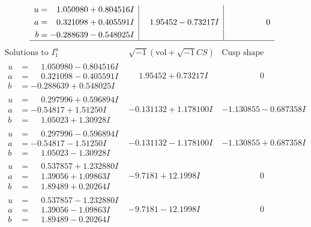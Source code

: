 \documentclass[1p]{elsarticle_modified}
\theoremstyle{definition}
\newcommand{\I}{\sqrt{-1}}
\begin{document}
$$\begin{array}{c|c|c}
\begin{aligned}
u &= \phantom{-}1.050980 + 0.804516 I \\
a &= \phantom{-}0.321098 + 0.405591 I \\
b &= -0.288639 - 0.548025 I\end{aligned}
 & \phantom{-}1.95452 - 0.73217 I & \phantom{-0.000000 } 0\\
 \hline 
 \end{array}$$\newpage$$\begin{array}{c|c|c}  
\text{Solutions to }I^u_{1}& \I (\text{vol} + \sqrt{-1}CS) & \text{Cusp shape}\\
 \hline 
\begin{aligned}
u &= \phantom{-}1.050980 - 0.804516 I \\
a &= \phantom{-}0.321098 - 0.405591 I \\
b &= -0.288639 + 0.548025 I\end{aligned}
 & \phantom{-}1.95452 + 0.73217 I & \phantom{-0.000000 } 0 \\ \hline\begin{aligned}
u &= \phantom{-}0.297996 + 0.596894 I \\
a &= -0.54817 + 1.51250 I \\
b &= \phantom{-}1.05023 + 1.30928 I\end{aligned}
 & -0.131132 + 1.178100 I & -1.130855 - 0.687358 I \\ \hline\begin{aligned}
u &= \phantom{-}0.297996 - 0.596894 I \\
a &= -0.54817 - 1.51250 I \\
b &= \phantom{-}1.05023 - 1.30928 I\end{aligned}
 & -0.131132 - 1.178100 I & -1.130855 + 0.687358 I \\ \hline\begin{aligned}
u &= \phantom{-}0.537857 + 1.232880 I \\
a &= \phantom{-}1.39056 + 1.09863 I \\
b &= \phantom{-}1.89489 + 0.20264 I\end{aligned}
 & -9.7181 + 12.1998 I & \phantom{-0.000000 } 0 \\ \hline\begin{aligned}
u &= \phantom{-}0.537857 - 1.232880 I \\
a &= \phantom{-}1.39056 - 1.09863 I \\
b &= \phantom{-}1.89489 - 0.20264 I\end{aligned}
 & -9.7181 - 12.1998 I & \phantom{-0.000000 } 0 \\ \hline\begin{aligned}

\end{aligned}
\end{array}$$
\end{document}
